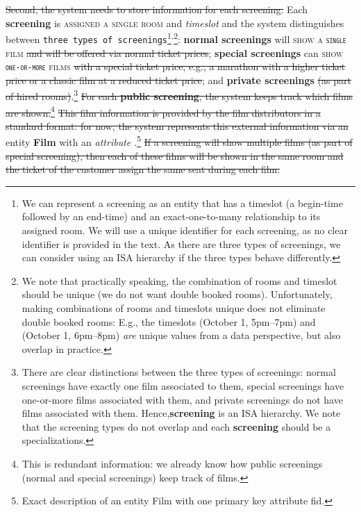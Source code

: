 \documentclass{article}
\newcommand{\ENT}[1]{\textcolor{colA}{\textbf{#1}}}
\newcommand{\AT}[1]{\textcolor{colB}{\textit{#1}}}
\newcommand{\RS}[1]{\textcolor{colC}{\textsc{#1}}}
\newcommand{\CON}[1]{\textcolor{colG}{\texttt{#1}}}
\newcommand{\IR}[1]{\textcolor{black!50}{\sout{#1}}}
\newcommand{\key}[1]{\underline{\smash{#1}}}
\begin{document}
\IR{Second, the system needs to store information for each screening.} Each \ENT{screening} is \RS{assigned a single room} and \AT{timeslot} and the system distinguishes between \CON{three types of screenings}\footnote{We can represent a screening as an entity that has a timeslot (a begin-time followed by an end-time) and an exact-one-to-many relationship to its assigned room. We will use a unique identifier for each screening, as no clear identifier is provided in the text. As there are three types of screenings, we can consider using an ISA hierarchy if the three types behave differently.}\textsuperscript{,}\footnote{We note that practically speaking, the combination of rooms and timeslot should be unique (we do not want double booked rooms). Unfortunately, making combinations of rooms and timeslots unique does not eliminate double booked rooms: E.g., the timeslots (October 1, 5pm--7pm) and (October 1, 6pm--8pm) \emph{are} unique values from a data perspective, but also overlap in practice.}: \ENT{normal screenings} will \RS{show a \CON{single} film} \IR{and will be offered via normal ticket prices}; \ENT{special screenings} can \RS{show \CON{one-or-more} films} \IR{with a special ticket price, e.g., a marathon with a higher ticket price or a classic film at a reduced ticket price}; and \ENT{private screenings} \IR{(as part of hired rooms)}.\footnote{There are clear distinctions between the three types of screenings: normal screenings have exactly one film associated to them, special screenings have one-or-more films associated with them, and private screenings do not have films associated with them. Hence,\ENT{screening} is an ISA hierarchy. We note that the screening types do not overlap and each \ENT{screening} should be a specializations.} \IR{For each \ENT{public screening}, the system keeps track which films are shown.}\footnote{This is redundant information: we already know how public screenings (normal and special screenings) keep track of films.} \IR{This film information is provided by the film distributors in a standard format: for now, the system represents this external information via an} entity \ENT{Film} with an \AT{attribute \CON{\key{fid}}}.\footnote{Exact description of an entity Film with one primary key attribute fid.} \IR{If a screening will show multiple films (as part of special screening), then each of these films will be shown in the same room and the ticket of the customer assign the same seat during each film.}
\end{document}
